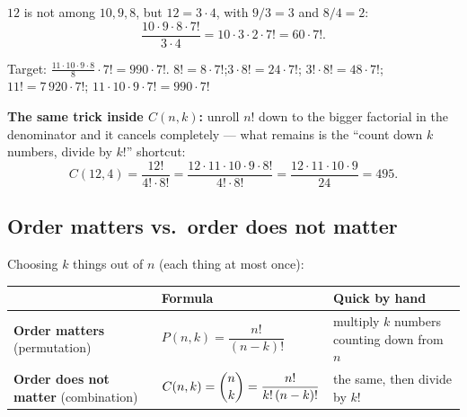 \documentclass{fkt-notes}
\theoremstyle{definition}
\begin{document}
\begin{example}[Split into factors: $\frac{10!}{3! \cdot 2!} = \frac{10!}{12}$, options ending in $7!$]
  $12$ is not among $10, 9, 8$, but $12 = 3 \cdot 4$, with
  $9 / 3 = 3$ and $8 / 4 = 2$:
  \[
    \frac{10 \cdot 9 \cdot 8 \cdot 7!}{3 \cdot 4}
    = 10 \cdot 3 \cdot 2 \cdot 7! = 60 \cdot 7!.
  \]
\end{example}

\begin{example}
  Target: $\frac{11 \cdot 10 \cdot 9 \cdot 8}{8} \cdot 7! = 990 \cdot 7!$.
  \quad $8! = 8 \cdot 7!$;\quad $3 \cdot 8! = 24 \cdot 7!$;\quad
  $3! \cdot 8! = 48 \cdot 7!$;\quad $11! = 7\,920 \cdot 7!$;\quad
  $11 \cdot 10 \cdot 9 \cdot 7! = 990 \cdot 7!$ \checkmark
\end{example}

\noindent \textbf{The same trick inside $C(n, k)$:} unroll $n!$ down
to the bigger factorial in the denominator and it cancels completely
--- what remains is the ``count down $k$ numbers, divide by $k!$''
shortcut:
\[
  C(12, 4) = \frac{12!}{4! \cdot 8!}
  = \frac{12 \cdot 11 \cdot 10 \cdot 9 \cdot 8!}{4! \cdot 8!}
  = \frac{12 \cdot 11 \cdot 10 \cdot 9}{24} = 495.
\]

\subsection{Order matters vs.\ order does not matter}
Choosing $k$ things out of $n$ (each thing at most once):

\begin{rulepar}
  \begin{center}
    \renewcommand{\arraystretch}{1.6}
    \begin{tabular}{@{}p{3.6cm} l p{4.4cm}@{}}
      \toprule
                    & Formula
                    & Quick by hand                                      \\
      \midrule
      \textbf{Order matters}
      (permutation) & $P(n, k) = \dfrac{n!}{(n-k)!}$
                    & multiply $k$ numbers counting down from $n$        \\
      \textbf{Order does not matter}
      (combination) & $C(n, k) = \dbinom{n}{k} = \dfrac{n!}{k!\,(n-k)!}$
                    & the same, then divide by $k!$                      \\
      \bottomrule
    \end{tabular}
  \end{center}
\end{rulepar}
\end{document}
